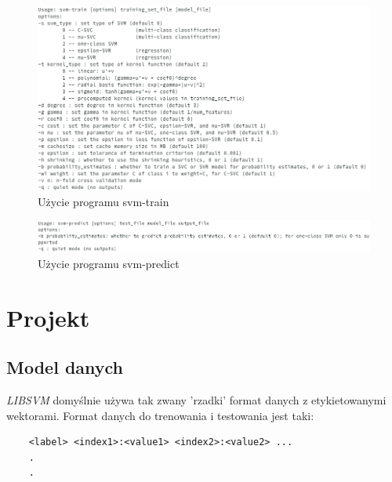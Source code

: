 \documentclass[paper=a4, fontsize=11pt]{scrartcl} %
\numberwithin{equation}{section} %
\numberwithin{figure}{section} %
\begin{document}
    \begin{figure}[H]
        \begin{center}
            \includegraphics[scale=0.6]{./img/svm_train_usage.png}
            \caption{Użycie programu svm-train}
            \label{fig:train_usage}
        \end{center}
    \end{figure}

    \begin{figure}[H]
        \begin{center}
            \includegraphics[scale=0.6]{./img/svm_predict_usage.png}
            \caption{Użycie programu svm-predict}
            \label{fig:predict_usage}
        \end{center}
    \end{figure}

\newpage 
\section{Projekt} %
\subsection{Model danych}
    \par \textit{LIBSVM} domyślnie używa tak zwany 'rzadki' format danych z etykietowanymi
    wektorami. Format danych do trenowania i testowania jest taki:

    \begin{verbatim}
    <label> <index1>:<value1> <index2>:<value2> ...
    .
    .
   
    \end{verbatim}
\end{document}
